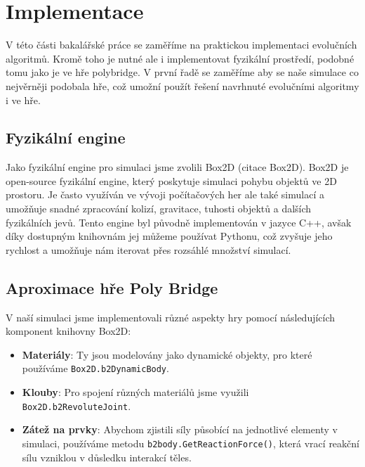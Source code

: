 \chapter{Implementace}

V této části bakalářské práce se zaměříme na praktickou implementaci evolučních algoritmů. Kromě toho je nutné ale i implementovat fyzikální prostředí, podobné tomu jako je ve hře polybridge. V první řadě se zaměříme aby se naše simulace co nejvěrněji podobala hře, což umožní použít řešení navrhnuté evolučními algoritmy i ve hře. 




\section{Fyzikální engine}

Jako fyzikální engine pro simulaci jsme zvolili Box2D (citace Box2D). Box2D je open-source fyzikální engine, který poskytuje simulaci pohybu objektů ve 2D prostoru. Je často využíván ve vývoji počítačových her ale také simulací a umožňuje snadné zpracování kolizí, gravitace, tuhosti objektů a dalších fyzikálních jevů. Tento engine byl původně implementován v jazyce C++, avšak díky dostupným knihovnám jej můžeme používat Pythonu, což zvyšuje jeho rychlost a umožňuje nám iterovat přes rozsáhlé množství simulací.

\section{Aproximace hře Poly Bridge}

V naší simulaci jsme implementovali různé aspekty hry pomocí následujících komponent knihovny Box2D:

\begin{itemize}
    \item \textbf{Materiály}: Ty jsou modelovány jako dynamické objekty, pro které používáme \texttt{Box2D.b2DynamicBody}.
    \item \textbf{Klouby}: Pro spojení různých materiálů jsme využili \texttt{Box2D.b2RevoluteJoint}.
    \item \textbf{Zátež na prvky}: Abychom zjistili síly působící na jednotlivé elementy v simulaci, používáme metodu \texttt{b2body.GetReactionForce()}, která vrací reakční sílu vzniklou v důsledku interakcí těles.
\end{itemize}

